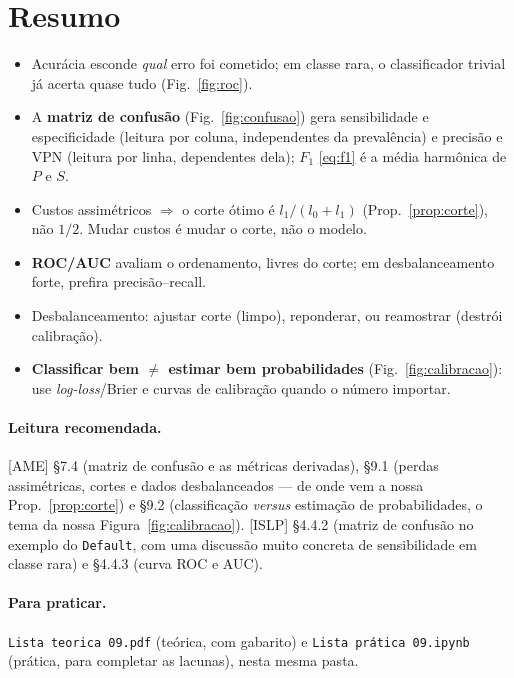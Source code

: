 \documentclass[11pt,a4paper]{article}
\begin{document}
\section*{Resumo}
\begin{itemize}[leftmargin=1.4cm]
  \item Acurácia esconde \emph{qual} erro foi cometido; em classe rara, o
        classificador trivial já acerta quase tudo (Fig.~\ref{fig:roc}).
  \item A \textbf{matriz de confusão} (Fig.~\ref{fig:confusao}) gera sensibilidade e
        especificidade (leitura por coluna, independentes da prevalência) e precisão
        e VPN (leitura por linha, dependentes dela); $F_1$ \eqref{eq:f1} é a média
        harmônica de $P$ e $S$.
  \item Custos assimétricos $\Rightarrow$ o corte ótimo é $l_1/(l_0+l_1)$
        (Prop.~\ref{prop:corte}), não $1/2$. Mudar custos é mudar o corte, não o
        modelo.
  \item \textbf{ROC/AUC} avaliam o ordenamento, livres do corte; em desbalanceamento
        forte, prefira precisão--recall.
  \item Desbalanceamento: ajustar corte (limpo), reponderar, ou reamostrar (destrói
        calibração).
  \item \textbf{Classificar bem $\neq$ estimar bem probabilidades}
        (Fig.~\ref{fig:calibracao}): use \emph{log-loss}/Brier e curvas de
        calibração quando o número importar.
\end{itemize}

\paragraph{Leitura recomendada.} [AME] §7.4 (matriz de confusão e as métricas
derivadas), §9.1 (perdas assimétricas, cortes e dados desbalanceados --- de onde vem
a nossa Prop.~\ref{prop:corte}) e §9.2 (classificação \emph{versus} estimação de
probabilidades, o tema da nossa Figura~\ref{fig:calibracao}). [ISLP] §4.4.2 (matriz
de confusão no exemplo do \texttt{Default}, com uma discussão muito concreta de
sensibilidade em classe rara) e §4.4.3 (curva ROC e AUC).

\paragraph{Para praticar.} \texttt{Lista teorica 09.pdf} (teórica, com gabarito) e \texttt{Lista prática 09.ipynb} (prática, para completar as lacunas), nesta mesma pasta.
\end{document}
